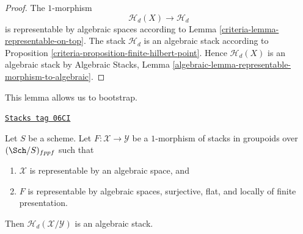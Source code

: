 \begin{proof}

The $1$-morphism
$$
\mathcal{H}_d(X) \longrightarrow \mathcal{H}_d
$$
is representable by algebraic spaces according to
Lemma \ref{criteria-lemma-representable-on-top}.
The stack $\mathcal{H}_d$ is an algebraic stack according to
Proposition \ref{criteria-proposition-finite-hilbert-point}.
Hence $\mathcal{H}_d(X)$ is an algebraic stack by
Algebraic Stacks,
Lemma \ref{algebraic-lemma-representable-morphism-to-algebraic}.
\end{proof}

This lemma allows us to bootstrap.

\begin{lemma}
\label{criteria-lemma-hilbert-stack-relative-space}
\href{https://stacks.math.columbia.edu/tag/06CI}{\texttt{Stacks tag 06CI}}

Let $S$ be a scheme. Let $F : \mathcal{X} \to \mathcal{Y}$ be a $1$-morphism
of stacks in groupoids over $(\Sch/S)_{fppf}$ such that
\begin{enumerate}
\item $\mathcal{X}$ is representable by an algebraic space, and
\item $F$ is representable by algebraic spaces, surjective, flat, and
locally of finite presentation.
\end{enumerate}
Then $\mathcal{H}_d(\mathcal{X}/\mathcal{Y})$ is an algebraic stack.
\end{lemma}

